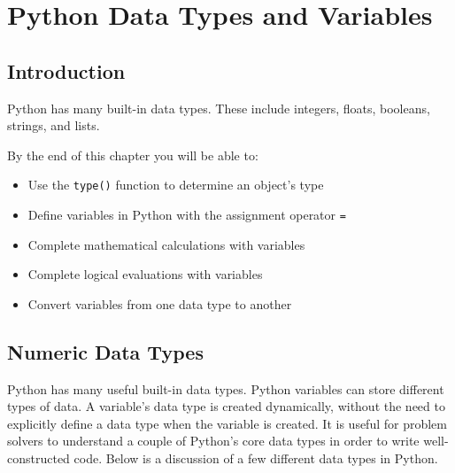 \documentclass{book}
\begin{document}
    




    
        \chapter{Python Data Types and
Variables}\label{python-data-types-and-variables}
    




    
        \section{Introduction}\label{introduction}

Python has many built-in data types. These include integers, floats,
booleans, strings, and lists.

By the end of this chapter you will be able to:

\begin{itemize}
\item
  Use the \lstinline!type()! function to determine an object's type
\item
  Define variables in Python with the assignment operator \lstinline!=!
\item
  Complete mathematical calculations with variables
\item
  Complete logical evaluations with variables
\item
  Convert variables from one data type to another
\end{itemize}
        \newpage



    




    
        \section{Numeric Data Types}\label{numeric-data-types}
    




    
        Python has many useful built-in data types. Python variables can store
different types of data. A variable's data type is created dynamically,
without the need to explicitly define a data type when the variable is
created. It is useful for problem solvers to understand a couple of
Python's core data types in order to write well-constructed code. Below
is a discussion of a few different data types in Python.
    
\end{document}
